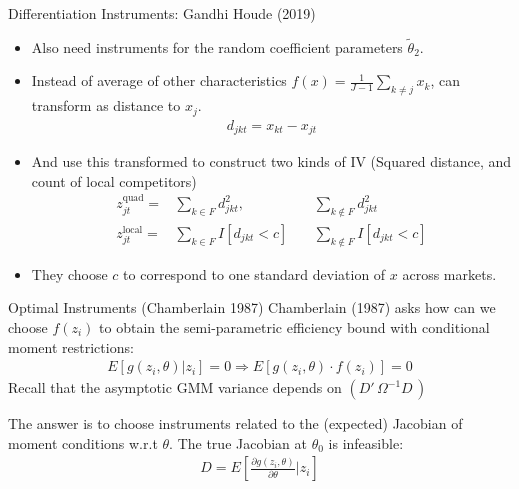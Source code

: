 \documentclass[xcolor=pdftex,dvipsnames,table,mathserif,aspectratio=169]{beamer}
\begin{document}
\begin{frame}{Differentiation Instruments: Gandhi Houde (2019)}
\small
\begin{itemize}
\item Also need instruments for the random coefficient parameters $\widetilde{\theta}_2$.
\item Instead of average of other characteristics $f(x) = \frac{1}{J-1} \sum_{k \neq j} x_k$, can transform as distance to $x_j$.
\begin{eqnarray*}
d_{jkt} =  x_{kt} - x_{jt}  
\end{eqnarray*}
\item And use this transformed to construct two kinds of IV (Squared distance, and count of local competitors)
\begin{eqnarray*}
z_{jt}^{\text{quad}} =& \sum_{k  \in F}  d_{jkt}^2,  \quad &\sum_{k \notin F}  d_{jkt}^2 \\
z_{jt}^{\text{local}} =& \sum_{k \in F}  I[d_{jkt} < c]   \quad &\sum_{k \notin F}   I[d_{jkt} < c]
\end{eqnarray*}
\item They choose $c$ to correspond to one standard deviation of $x$ across markets.
\end{itemize}
\end{frame}




\begin{frame}{Optimal Instruments (Chamberlain 1987)}
Chamberlain (1987) asks how can we choose $f(z_i)$ to obtain the semi-parametric efficiency bound with conditional moment restrictions:
\begin{align*}
E[g(z_i,\theta) | z_i]=0 \Rightarrow E[g(z_i,\theta) \cdot f(z_i) ]=0 
\end{align*}
Recall that the asymptotic GMM variance depends on $(D'\, \Omega^{-1} D\,)$

The answer is to choose instruments related to the (expected) Jacobian of moment conditions w.r.t $\theta$. The true Jacobian at $\theta_0$ is \alert{infeasible}:
\begin{align*}
D=E\left[\frac{\partial g(z_i,\theta)}{\partial \theta} | z_i \right]
\end{align*}
\end{frame}
\end{document}
